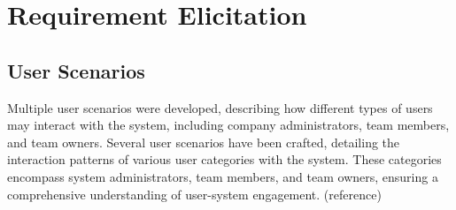 \documentclass{l4proj}
\begin{document}
\section{Requirement Elicitation}

\subsection{User Scenarios}

Multiple user scenarios were developed, describing how different types of users may interact with the system, including company administrators, team members, and team owners. Several user scenarios have been crafted, detailing the interaction patterns of various user categories with the system. These categories encompass system administrators, team members, and team owners, ensuring a comprehensive understanding of user-system engagement. (reference)
\end{document}
